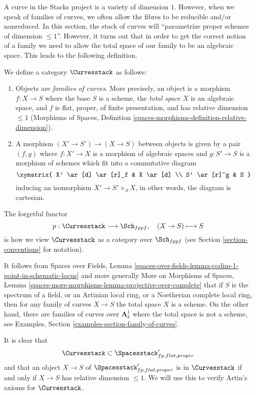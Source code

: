 \medskip\noindent
A curve in the Stacks project is a variety of dimension $1$.
However, when we speak of families of curves, we often allow
the fibres to be reducible and/or nonreduced. In this section,
the stack of curves will ``parametrize proper schemes of
dimension $\leq 1$''. However, it turns out that in order
to get the correct notion of a family we need to allow the
total space of our family to be an algebraic space.
This leads to the following definition.

\begin{situation}
\label{situation-curves}
We define a category $\Curvesstack$ as follows:
\begin{enumerate}
\item Objects are {\it families of curves}. More precisely, an
object is a morphism $f : X \to S$ where the base $S$ is a scheme,
the {\it total space} $X$ is an algebraic space, and
$f$ is flat, proper, of finite presentation,
and has relative dimension $\leq 1$ (Morphisms of Spaces, Definition
\ref{spaces-morphisms-definition-relative-dimension}).
\item A morphism $(X' \to S') \to (X \to S)$ between objects
is given by a pair $(f, g)$ where $f : X' \to X$ is a morphism
of algebraic spaces and $g : S' \to S$ is a morphism of schemes
which fit into a commutative diagram
$$
\xymatrix{
X' \ar[d] \ar[r]_f & X \ar[d] \\
S' \ar[r]^g & S
}
$$
inducing an isomorphism $X' \to S' \times_S X$, in other words, the
diagram is cartesian.
\end{enumerate}
The forgetful functor
$$
p : \Curvesstack \longrightarrow \Sch_{fppf},\quad
(X \to S) \longmapsto S
$$
is how we view $\Curvesstack$ as a category over $\Sch_{fppf}$
(see Section \ref{section-conventions} for notation).
\end{situation}

\noindent
It follows from Spaces over Fields, Lemma
\ref{spaces-over-fields-lemma-codim-1-point-in-schematic-locus}
and more generally
More on Morphisms of Spaces, Lemma
\ref{spaces-more-morphisms-lemma-projective-over-complete}
that if $S$ is the spectrum of a field, or an Artinian local ring,
or a Noetherian complete local ring, then for any family of curves
$X \to S$ the total space $X$ is a scheme.
On the other hand, there are families of curves
over $\mathbf{A}^1_k$ where the total space is not a scheme, see
Examples, Section \ref{examples-section-family-of-curves}.

\medskip\noindent
It is clear that
\begin{equation}
\label{equation-curves-over-proper-spaces}
\Curvesstack \subset \Spacesstack'_{fp, flat, proper}
\end{equation}
and that an object $X \to S$ of $\Spacesstack'_{fp, flat, proper}$
is in $\Curvesstack$ if and only if $X \to S$ has relative
dimension $\leq 1$. We will use this to verify Artin's axioms
for $\Curvesstack$.

